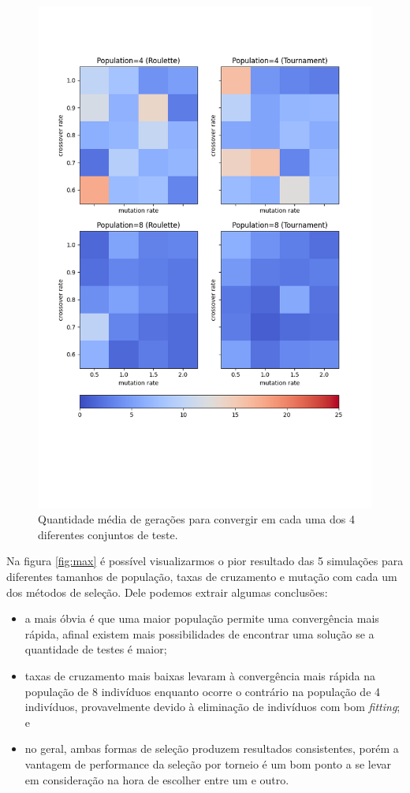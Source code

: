 \documentclass[12pt]{article}
\begin{document}
\begin{figure}
    \centering
    \includegraphics{fig/mean_colors.png}
    \caption{Quantidade média de gerações para convergir em cada uma dos 4 diferentes conjuntos de teste.}
    \label{fig:mean}
\end{figure}

Na figura \ref{fig:max} é possível visualizarmos o pior resultado das 5 simulações para diferentes tamanhos de população, taxas de cruzamento e mutação com cada um dos métodos de seleção. Dele podemos extrair algumas conclusões:

\begin{itemize}
    \item a mais óbvia é que uma maior população permite uma convergência mais rápida, afinal existem mais possibilidades de encontrar uma solução se a quantidade de testes é maior;
    \item taxas de cruzamento mais baixas levaram à convergência mais rápida na população de 8 indivíduos enquanto ocorre o contrário na população de 4 indivíduos, provavelmente devido à eliminação de indivíduos com bom \textit{fitting}; e
    \item no geral, ambas formas de seleção produzem resultados consistentes, porém a vantagem de performance da seleção por torneio é um bom ponto a se levar em consideração na hora de escolher entre um e outro.
\end{itemize}
\end{document}
